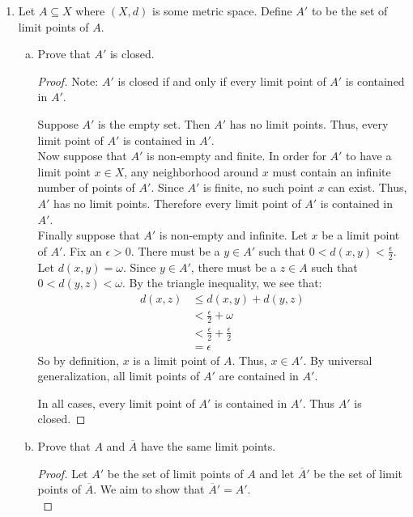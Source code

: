 \documentclass{amsart}
\begin{document}
\begin{enumerate}[1.]
\begin{proof}
\end{proof}



All points in A are isolated points.
A is neither open nor closed.


\newpage

\item Let $A \subseteq X$ where $(X,d)$ is some metric space. Define $A'$ to be the set of limit points of $A$.
\begin{enumerate}[(a)]
\item Prove that $A'$ is closed.
\begin{proof} Note: $A'$ is closed if and only if every limit point of $A'$ 
    is contained in $A'$.

    Suppose $A'$ is the empty set. Then $A'$ has no limit points. Thus, every limit point 
    of $A'$ is contained in $A'$.\\

    Now suppose that $A'$ is non-empty and finite. In order for $A'$ to have a limit point
    $x \in X$, any neighborhood around $x$ must contain an infinite number of points of $A'$.
    Since $A'$ is finite, no such point $x$ can exist. Thus, $A'$ has no limit points. Therefore
    every limit point of $A'$ is contained in $A'$. \\
    
    Finally suppose that $A'$ is non-empty and infinite. Let $x$ be a limit point of $ A'$.
    Fix an $\epsilon > 0$. There must be a $y \in A'$ such that $0 < d(x,y) < \frac{\epsilon}{2}$.
    Let $d(x,y) = \omega$. Since $y \in A'$, there must be a $z \in A$ such that 
    $0 < d(y, z) < \omega$. By the triangle inequality, we see that:
    \begin{align*}
        d(x,z) &\leq d(x,y) + d(y,z) \\
        &<  \frac{\epsilon}{2} + \omega \\
        &< \frac{\epsilon}{2} + \frac{\epsilon}{2} \\
        &= \epsilon
    \end{align*}
    So by definition, $x$ is a limit point of $A$. Thus, $x \in A'$. 
    By universal generalization, all limit points of $A'$ are contained in $A'$.
    
    In all cases, every limit point of $A'$ is contained in $A'$. Thus 
    $A'$ is closed.
\end{proof}
\item Prove that $A$ and $\overline{A}$ have the same limit points.
\begin{proof}
    Let $A'$ be the set of limit points of $A$ and let $\overline{A}'$ be the
    set of limit points of $\overline{A}$. We aim to show that $\overline{A}' = A'$. \\


\end{proof}
\end{enumerate}
\end{enumerate}
\end{document}
